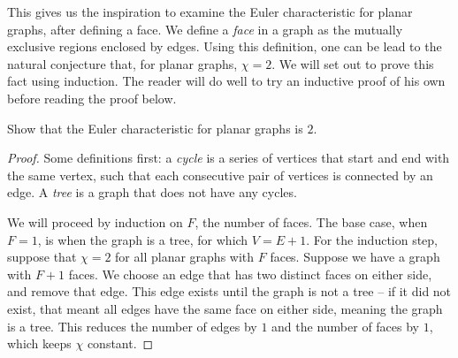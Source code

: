 \documentclass[11pt,paper=letter]{scrartcl}
\begin{document}
This gives us the inspiration to examine the Euler characteristic for planar graphs, after defining a face. We define a \emph{face} in a graph as the mutually exclusive regions enclosed by edges. Using this definition, one can be lead to the natural conjecture that, for planar graphs, $\chi = 2$. We will set out to prove this fact using induction. The reader will do well to try an inductive proof of his own before reading the proof below.

\begin{problem}
Show that the Euler characteristic for planar graphs is $2$.
\end{problem}

\begin{proof}
Some definitions first: a \emph{cycle} is a series of vertices that start and end with the same vertex, such that each consecutive pair of vertices is connected by an edge. A \emph{tree} is a graph that does not have any cycles.

\begin{center}
\end{center}

We will proceed by induction on $F$, the number of faces. The base case, when $F = 1$, is when the graph is a tree, for which $V = E + 1$. For the induction step, suppose that $\chi = 2$ for all planar graphs with $F$ faces. Suppose we have a graph with $F+1$ faces. We choose an edge that has two distinct faces on either side, and remove that edge. This edge exists until the graph is not a tree -- if it did not exist, that meant all edges have the same face on either side, meaning the graph is a tree. This reduces the number of edges by $1$ and the number of faces by $1$, which keeps $\chi$ constant.
\end{proof}
\end{document}
